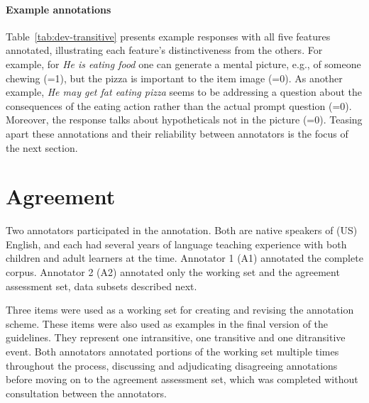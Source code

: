 \paragraph{Example annotations}

Table~\ref{tab:dev-transitive} presents example responses with all five features annotated, illustrating each feature's distinctiveness from the others.  For example, for \textit{He is eating food} one can generate a mental picture, e.g., of someone chewing (=1), but the pizza is important to the item image (=0).  As another example, \textit{He may get fat eating pizza} seems to be addressing a question about the consequences of the eating action rather than the actual prompt question (=0). Moreover, the response talks about hypotheticals not in the picture (=0).
Teasing apart these annotations and their reliability between annotators is the focus of the next section.


\section{Agreement}
\label{sec:agreement}
Two annotators participated in the annotation. Both are native speakers of (US) English, and each had several years of language teaching experience with both children and adult learners at the time. Annotator 1 (A1) annotated the complete corpus. Annotator 2 (A2) annotated only the working set and the agreement assessment set, data subsets described next.

Three items were used as a working set for creating and revising the annotation scheme. These items were also used as examples in the final version of the guidelines. They represent one intransitive, one transitive and one ditransitive event. Both annotators annotated portions of the working set multiple times throughout the process, discussing and adjudicating disagreeing annotations before moving on to the agreement assessment set, which was completed without consultation between the annotators.

